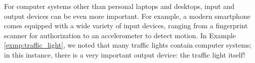 For computer systems other than personal laptops and desktops, input and output devices can be even more important. For example, a modern smartphone comes equipped with a wide variety of input devices, ranging from a fingerprint scanner for authorization to an accelerometer to detect motion. In Example \ref{exmp:traffic_light}, we noted that many traffic lights contain computer systems; in this instance, there is a very important output device: the traffic light itself!




